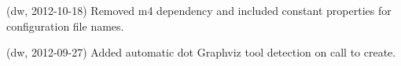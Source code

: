 
\begin{DoxyRefList}
\item[\label{changelog1_4__changelog1_4000001}%
\hypertarget{changelog1_4__changelog1_4000001}{}%
Class \hyperlink{class_matlab_doc_maker}{Matlab\+Doc\+Maker} ](dw, 2012-\/10-\/18) Removed {\ttfamily m4} dependency and included constant properties for configuration file names.

(dw, 2012-\/09-\/27) Added automatic dot Graphviz tool detection on call to create.
\end{DoxyRefList}